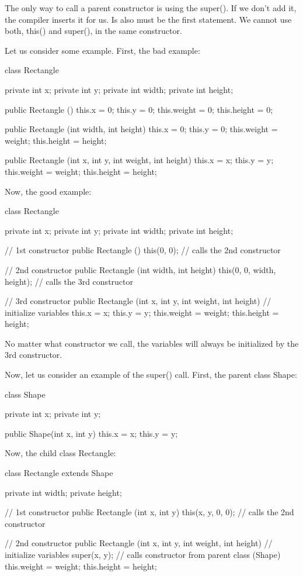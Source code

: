 The only way to call a parent constructor is using the super(). If we don't add it, the compiler 
inserts it for us. Is also must be the first statement. We cannot use both, this() and super(), 
in the same constructor. 

Let us consider some example. First, the bad example: 
\begin{listing}{1}
class Rectangle {
    private int x;
    private int y;
    private int width;
    private int height;

    public Rectangle () {
        this.x = 0;
        this.y = 0;
        this.weight = 0; 
        this.height = 0;
    }

    public Rectangle (int width, int height) {
        this.x = 0;
        this.y = 0;
        this.weight = weight; 
        this.height = height;
    }

    public Rectangle (int x, int y, int weight, int height) {
        this.x = x;
        this.y = y;
        this.weight = weight; 
        this.height = height;
    }

}
\end{listing}
Now, the good example:
\begin{listing}{1}
class Rectangle {
    private int x;
    private int y;
    private int width;
    private int height;

    // 1st constructor
    public Rectangle () {
        this(0, 0); // calls the 2nd constructor
    }

    // 2nd constructor
    public Rectangle (int width, int height) {
        this(0, 0, width, height); // calls the 3rd constructor
    }

    // 3rd constructor
    public Rectangle (int x, int y, int weight, int height) {
        // initialize variables 
        this.x = x;
        this.y = y;
        this.weight = weight; 
        this.height = height;
    }

}
\end{listing}
No matter what constructor we call, the variables will always be initialized by the 3rd constructor.

Now, let us consider an example of the super() call. First, the parent class Shape:
\begin{listing}{1}
class Shape { 
    private int x; 
    private int y; 

    public Shape(int x, int y) {
        this.x = x;
        this.y = y; 
    }
}
\end{listing}
Now, the child class Rectangle: 
\begin{listingcont}
class Rectangle extends Shape {
    private int width; 
    private height; 

    // 1st constructor
    public Rectangle (int x, int y) {
        this(x, y, 0, 0); // calls the 2nd constructor
    }

    // 2nd constructor
    public Rectangle (int x, int y, int weight, int height) {
        // initialize variables 
        super(x, y); // calls constructor from parent class (Shape)
        this.weight = weight; 
        this.height = height;
    }

}
\end{listingcont}


